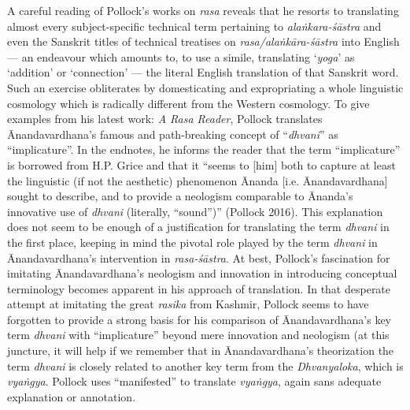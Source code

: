 A careful reading of Pollock’s works on \textsl{rasa} reveals that he resorts to translating almost every subject-specific technical term pertaining to \textsl{alaṅkara-śāstra} and even the Sanskrit titles of technical treatises on \textsl{rasa/alaṅkāra-śāstra} into English --- an endeavour which amounts to, to use a simile, translating ‘\textsl{yoga}’ as ‘addition’ or ‘connection’ --- the literal English translation of that Sanskrit word. Such an exercise obliterates by domesticating and expropriating a whole linguistic cosmology which is radically different from the Western cosmology. To give examples from his latest work: \textsl{A Rasa Reader}, Pollock translates Ānandavardhana’s famous and path-breaking concept of “\textsl{dhvani}” as “implicature”. In the endnotes, he informs the reader that the term “implicature” is borrowed from H.P. Grice and that it “seems to [him] both to capture at least the linguistic (if not the aesthetic) phenomenon Ānanda [i.e. Ānandavardhana] sought to describe, and to provide a neologism comparable to Ānanda’s innovative use of \textsl{dhvani} (literally, “sound”)” (Pollock 2016). This explanation does not seem to be enough of a justification for translating the term \textsl{dhvani} in the first place, keeping in mind the pivotal role played by the term \textsl{dhvani} in Ānandavardhana’s intervention in \textsl{rasa-śāstra}. At best, Pollock’s fascination for imitating Ānandavardhana’s neologism and innovation in introducing conceptual terminology becomes apparent in his approach of translation. In that desperate attempt at imitating the great \textsl{rasika} from Kashmir, Pollock seems to have forgotten to provide a strong basis for his comparison of Ānandavardhana’s key term \textsl{dhvani} with “implicature” beyond mere innovation and neologism (at this juncture, it will help if we remember that in Ānandavardhana’s theorization the term \textsl{dhvani} is closely related to another key term from the \textsl{Dhvanyaloka}, which is \textsl{vyaṅgya}. Pollock uses “manifested” to translate \textsl{vyaṅgya}, again sans adequate explanation or annotation. 

